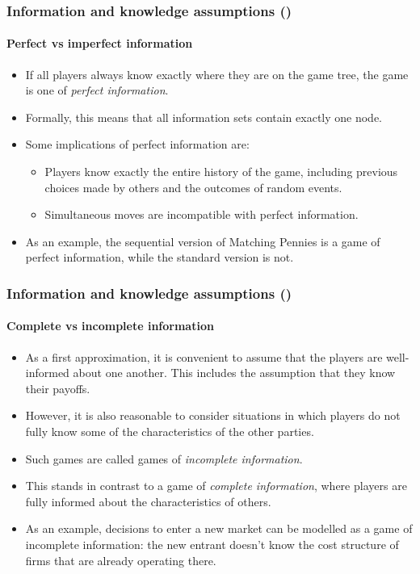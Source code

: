 \documentclass[10pt]{beamer}
\theoremstyle{definition}
\begin{document}
\begin{frame}[fragile]\setcounter{slidenum}{1}
\frametitle{Information and knowledge assumptions ()}
\framesubtitle{Perfect vs imperfect information}
\begin{itemize}\itemsep1em
\item If all players always know exactly where they are on the game tree, the game is one of \emph{perfect information}.
\item Formally, this means that all information sets contain exactly one node.
\item Some implications of perfect information are:
	\begin{itemize}\itemsep1em
		\item Players know exactly the entire history of the game, including previous choices made by others and the outcomes of random events.
		\item Simultaneous moves are incompatible with perfect information.
	\end{itemize}
\item As an example, the sequential version of Matching Pennies is a game of perfect information, while the standard version is not.
\end{itemize}
\end{frame}



\begin{frame}[fragile]
\frametitle{Information and knowledge assumptions ()}
\framesubtitle{Complete vs incomplete information}
\begin{itemize}\itemsep1em
\item As a first approximation, it is convenient to assume that the players are well-informed about one another. This includes the assumption that they know their payoffs.
\item However, it is also reasonable to consider situations in which players do not fully know some of the characteristics of the other parties.
\item Such games are called games of \emph{incomplete information}.
\item This stands in contrast to a game of \emph{complete information}, where players are fully informed about the characteristics of others.
\item As an example, decisions to enter a new market can be modelled as a game of incomplete information: the new entrant doesn't know the cost structure of firms that are already operating there.
\end{itemize}
\end{frame}
\end{document}
